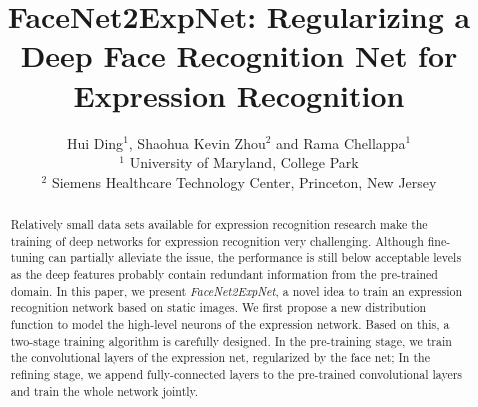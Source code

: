 \documentclass[a4paper, 10pt, conference]{ieeeconf}      %
\title{\LARGE \bf
FaceNet2ExpNet: Regularizing a Deep Face Recognition Net for Expression Recognition
}
\author{\parbox{16cm}{\centering
    {\large Hui Ding$^1$, Shaohua Kevin Zhou$^2$ and Rama Chellappa$^1$}\\
    {\normalsize
    $^{1}$ University of Maryland, College Park\\
    $^2$ Siemens Healthcare Technology Center, Princeton, New Jersey}}
}
\begin{document}
\ifFGfinal
\thispagestyle{empty}
\pagestyle{empty}
\else
\pagestyle{plain}
\fi
\maketitle



\begin{abstract}
Relatively small data sets available for expression recognition research make the training of deep networks  for expression recognition very challenging. Although fine-tuning can partially alleviate the issue, the performance is still below acceptable levels as the deep features probably contain redundant information from the pre-trained domain.
In this paper, we present \emph{FaceNet2ExpNet}, a novel idea to train an expression recognition network based on static images. We first propose a new distribution function to model the high-level neurons of the expression network. 
Based on this, a two-stage training algorithm is carefully designed. In the pre-training stage, we train the convolutional layers of the expression net, regularized by the face net; In the refining stage, we append fully-connected layers to the pre-trained convolutional layers and train the whole network jointly.

\end{abstract}
\end{document}
